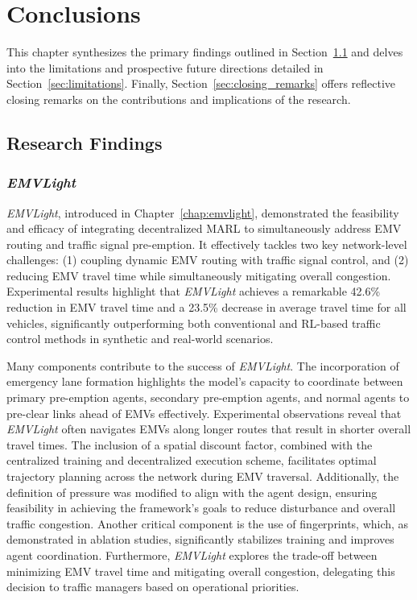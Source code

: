 \chapter{Conclusions}\label{chap:conclusion}
This chapter synthesizes the primary findings outlined in Section~\ref{sec:findings} and delves into the limitations and prospective future directions detailed in Section~\ref{sec:limitations}. Finally, Section~\ref{sec:closing_remarks} offers reflective closing remarks on the contributions and implications of the research.
\section{Research Findings}\label{sec:findings}
\subsection{\textit{EMVLight}}
\textit{EMVLight}, introduced in Chapter~\ref{chap:emvlight}, demonstrated the feasibility and efficacy of integrating decentralized MARL to simultaneously address EMV routing and traffic signal pre-emption. It effectively tackles two key network-level challenges: (1) coupling dynamic EMV routing with traffic signal control, and (2) reducing EMV travel time while simultaneously mitigating overall congestion. Experimental results highlight that \textit{EMVLight} achieves a remarkable 42.6\% reduction in EMV travel time and a 23.5\% decrease in average travel time for all vehicles, significantly outperforming both conventional and RL-based traffic control methods in synthetic and real-world scenarios.

Many components contribute to the success of \textit{EMVLight}. The incorporation of emergency lane formation highlights the model's capacity to coordinate between primary pre-emption agents, secondary pre-emption agents, and normal agents to pre-clear links ahead of EMVs effectively. Experimental observations reveal that \textit{EMVLight} often navigates EMVs along longer routes that result in shorter overall travel times. The inclusion of a spatial discount factor, combined with the centralized training and decentralized execution scheme, facilitates optimal trajectory planning across the network during EMV traversal. Additionally, the definition of pressure was modified to align with the agent design, ensuring feasibility in achieving the framework's goals to reduce disturbance and overall traffic congestion. Another critical component is the use of fingerprints, which, as demonstrated in ablation studies, significantly stabilizes training and improves agent coordination. Furthermore, \textit{EMVLight} explores the trade-off between minimizing EMV travel time and mitigating overall congestion, delegating this decision to traffic managers based on operational priorities.

